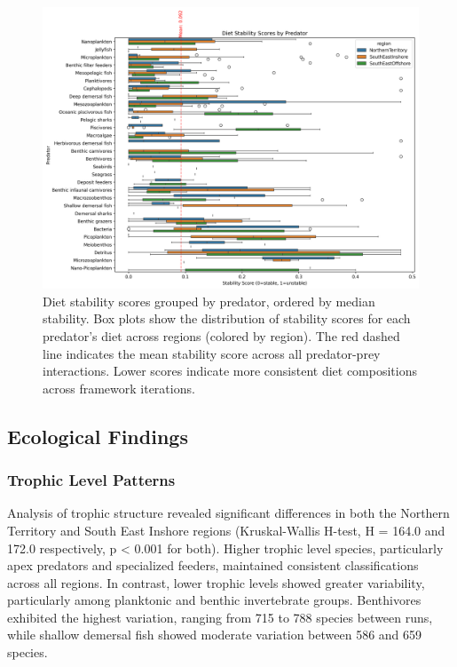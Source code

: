\begin{figure}[htbp]
    \centering
    \includegraphics[width=\textwidth]{figures/predator_stability_boxplots.png}
    \caption{Diet stability scores grouped by predator, ordered by median stability. Box plots show the distribution of stability scores for each predator's diet across regions (colored by region). The red dashed line indicates the mean stability score across all predator-prey interactions. Lower scores indicate more consistent diet compositions across framework iterations.}
    \label{fig:predator_stability}
\end{figure}

\subsection{Ecological Findings}

\subsubsection{Trophic Level Patterns}
Analysis of trophic structure revealed significant differences in both the Northern Territory and South East Inshore regions (Kruskal-Wallis H-test, H = 164.0 and 172.0 respectively, p < 0.001 for both). Higher trophic level species, particularly apex predators and specialized feeders, maintained consistent classifications across all regions. In contrast, lower trophic levels showed greater variability, particularly among planktonic and benthic invertebrate groups. Benthivores exhibited the highest variation, ranging from 715 to 788 species between runs, while shallow demersal fish showed moderate variation between 586 and 659 species.
